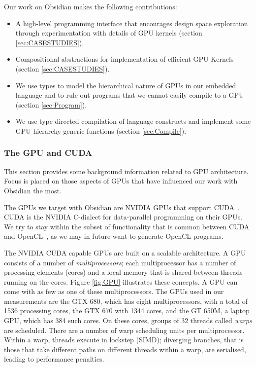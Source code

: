 Our work on Obsidian makes the following contributions: 
\begin{itemize} 
  \item A high-level programming interface that encourages design space exploration through experimentation with 
    details of GPU kernels (section \ref{sec:CASESTUDIES}).
  \item Compositional abstractions for implementation of efficient GPU 
    Kernels (section \ref{sec:CASESTUDIES}).
  \item We use types to model the hierarchical nature of GPUs in our embedded 
    language and to rule out programs that we cannot easily compile to a GPU (section \ref{sec:Program}).
  \item We use type directed compilation of language constructs and 
    implement some GPU hierarchy generic functions (section \ref{sec:Compile}).
\end{itemize} 


\subsubsection{The GPU and CUDA}
\label{sec:GPU}

This section provides some background information related to GPU architecture. 
Focus is placed on those aspects of GPUs that have influenced our work with 
Obsidian the most. 

The GPUs we target with Obsidian are NVIDIA GPUs that support CUDA~.
CUDA is the NVIDIA C-dialect for data-parallel programming on their GPUs. 
We try to stay within the subset of functionality that is common 
between CUDA and OpenCL~, as we may in future want to generate 
OpenCL programs. 

The NVIDIA CUDA capable GPUs are built on a scalable architecture. A GPU 
consists of a number of {\em multiprocessors}; each multiprocessor has a 
number of processing elements (cores) and a local memory that is shared 
between threads running on the cores. Figure \ref{fig:GPU} illustrates these 
concepts. A GPU can come with as few as one of these multiprocessors.
The GPUs used in our measurements are the GTX 680, which has eight 
multiprocessors, with a total of 1536 processing cores, the GTX 670 with 1344 cores, 
and the GT 650M, a laptop GPU, which has 384 such cores. On these cores, 
groups of 32 threads called {\em warps} are scheduled. There are a number 
of warp scheduling units per multiprocessor. Within a warp, threads execute 
in lockstep (SIMD); diverging branches, that is those that take different 
paths on different threads within a warp, are serialised, leading to 
performance penalties. 

